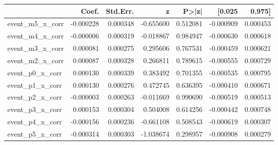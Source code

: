 \begin{tabular}{lrrrrrr}
\toprule
 & Coef. & Std.Err. & z & P>|z| & [0.025 & 0.975] \\
\midrule
event_m5_x_corr & -0.000228 & 0.000348 & -0.655600 & 0.512081 & -0.000909 & 0.000453 \\
event_m4_x_corr & -0.000006 & 0.000319 & -0.018867 & 0.984947 & -0.000630 & 0.000618 \\
event_m3_x_corr & 0.000081 & 0.000275 & 0.295606 & 0.767531 & -0.000459 & 0.000621 \\
event_m2_x_corr & 0.000087 & 0.000328 & 0.266811 & 0.789615 & -0.000555 & 0.000729 \\
event_p0_x_corr & 0.000130 & 0.000339 & 0.383492 & 0.701355 & -0.000535 & 0.000795 \\
event_p1_x_corr & 0.000130 & 0.000276 & 0.472745 & 0.636395 & -0.000410 & 0.000671 \\
event_p2_x_corr & -0.000003 & 0.000263 & -0.011669 & 0.990690 & -0.000519 & 0.000513 \\
event_p3_x_corr & 0.000153 & 0.000304 & 0.504008 & 0.614256 & -0.000442 & 0.000748 \\
event_p4_x_corr & -0.000156 & 0.000236 & -0.661108 & 0.508543 & -0.000619 & 0.000307 \\
event_p5_x_corr & -0.000314 & 0.000303 & -1.038674 & 0.298957 & -0.000908 & 0.000279 \\
\bottomrule
\end{tabular}
